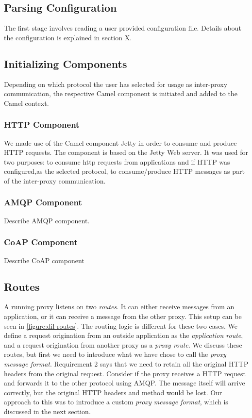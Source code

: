 \subsection{Parsing Configuration}

The first stage involves reading a user provided configuration file. Details about the configuration is explained in section X.

\subsection{Initializing Components}

Depending on which protocol the user has selected for usage as inter-proxy
communication, the respective Camel component is initiated and added to the
Camel context.

\subsubsection{HTTP Component}

We made use of the Camel component Jetty in order to consume and produce HTTP
requests. The component is based on the Jetty Web server\cite{jetty-homepage}.
It was used for two purposes: to consume \gls{http} requests from applications
and if HTTP was configured,as the selected protocol, to consume/produce HTTP
messages as part of the inter-proxy communication.

\subsubsection{AMQP Component}

Describe AMQP component.

\subsubsection{CoAP Component}

Describe CoAP component

\subsection{Routes}

A running proxy listens on two \textit{routes}. It can either receive messages
from an application, or it can receive a message from the other proxy. This
setup can be seen in \cref{figure:dil-routes}. The routing logic is different
for these two cases. We define a request origination from an outside application
as the \textit{application route}, and a request origination from another proxy
as a \textit{proxy route}. We discuss these routes, but first we need to
introduce what we have chose to call the \textit{proxy message format}.
Requirement 2 says that we need to retain all the original HTTP headers from the
original request. Consider if the proxy receives a HTTP request and forwards it
to the other protocol using AMQP. The message itself will arrive correctly, but
the original HTTP headers and method would be lost. Our approach to this was to
introduce a custom \textit{proxy message format}, which is discussed in the next
section.

